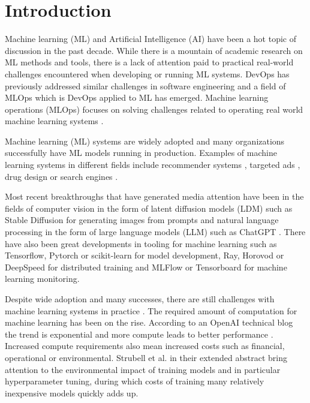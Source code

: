 \chapter{Introduction}
\label{chap:intro}


Machine learning (ML) and Artificial Intelligence (AI) have been a hot topic of discussion in the past decade. While there is a mountain of academic research on ML methods and tools, there is a lack of attention paid to practical real-world challenges encountered when developing or running ML systems. DevOps has previously addressed similar challenges in software engineering and a field of MLOps which is DevOps applied to ML has emerged. Machine learning operations (MLOps) focuses on solving challenges related to operating real world machine learning systems \parencite{kreuzbergerMachineLearningOperations2023}.

Machine learning (ML) systems are widely adopted and many organizations successfully have ML models running in production.
Examples of machine learning systems in different fields include recommender systems , targeted ads \parencite{domingosFewUsefulThings2012}, drug design \parencite{domingosFewUsefulThings2012} or search engines \parencite{domingosFewUsefulThings2012}.

Most recent breakthroughs that have generated media attention have been in the fields of computer vision in the form of latent diffusion models (LDM) \parencite{rombachHighResolutionImageSynthesis2022} such as Stable Diffusion \parencite{stabilityaiStableDiffusionPublic2022} for generating images from prompts and natural language processing in the form of large language models (LLM) \parencite{touvronLLaMAOpenEfficient2023} such as ChatGPT \parencite{openaiIntroducingChatGPT2022}. There have also been great developments in tooling for machine learning such as Tensorflow, Pytorch or scikit-learn  for model development, Ray, Horovod or DeepSpeed  for distributed training and MLFlow or Tensorboard  for machine learning monitoring.



Despite wide adoption and many successes, there are still challenges with machine learning systems in practice . The required amount of computation for machine learning has been on the rise. According to an OpenAI technical blog the trend is exponential and more compute leads to better performance \parencite{amodeiAICompute2018}. Increased compute requirements also mean increased costs such as financial, operational or environmental. Strubell et al. \parencite*{strubellEnergyPolicyConsiderations2020} in their extended abstract bring attention to the environmental impact of training models and in particular hyperparameter tuning, during which costs of training many relatively inexpensive models quickly adds up.

